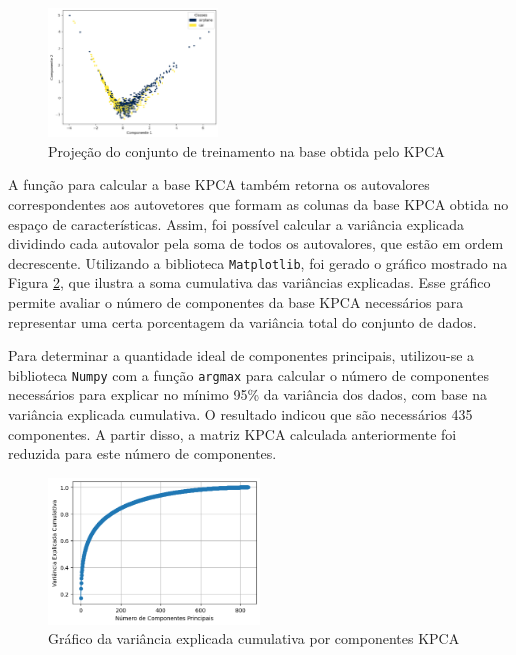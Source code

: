 \documentclass[]{abntex2}
\begin{document}
\begin{figure}[H]
    \centering 
    \includegraphics[width=0.4\textwidth]{imgs/ex1/KPCA.png}
    \caption{Projeção do conjunto de treinamento na base obtida pelo KPCA}
    \label{fig:KPCA} %
\end{figure}

A função para calcular a base KPCA também retorna os autovalores correspondentes aos autovetores que formam as colunas da base KPCA obtida no espaço de características. Assim, foi possível calcular a variância explicada dividindo cada autovalor pela soma de todos os autovalores, que estão em ordem decrescente. Utilizando a biblioteca \texttt{Matplotlib}, foi gerado o gráfico mostrado na Figura \ref{fig:vari_kpca}, que ilustra a soma cumulativa das variâncias explicadas. Esse gráfico permite avaliar o número de componentes da base KPCA necessários para representar uma certa porcentagem da variância total do conjunto de dados.

Para determinar a quantidade ideal de componentes principais, utilizou-se a biblioteca \texttt{Numpy} com a função \texttt{argmax} para calcular o número de componentes necessários para explicar no mínimo 95\% da variância dos dados, com base na variância explicada cumulativa. O resultado indicou que são necessários 435 componentes. A partir disso, a matriz KPCA calculada anteriormente foi reduzida para este número de componentes.

\begin{figure}[H]
    \centering 
    \includegraphics[width=0.5\textwidth]{imgs/ex1/vari_kpca.png}
    \caption{Gráfico da variância explicada cumulativa por componentes KPCA}
    \label{fig:vari_kpca} %
\end{figure}
\end{document}
